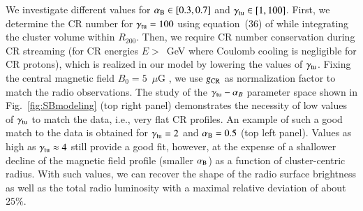 \documentclass[useAMS,usenatbib]{mn2e}
\begin{document}
We investigate different values for $\alpha_{{\mathrm{B}}}\in [0.3,0.7]$ and
$\gamma_{{\mathrm{tu}}}\in [1,100]$. First, we determine the CR number for
$\gamma_{{\mathrm{tu}}}=100$ using equation~(36) of \cite{2011A&A...527A..99E} while
integrating the cluster volume within $R_{200}$. Then, we require CR number
conservation during CR streaming (for CR energies $E>$~GeV where Coulomb cooling
is negligible for CR protons), which is realized in our model by lowering the
values of $\gamma_{{\mathrm{tu}}}$. Fixing the central magnetic field
$B_{0}=5$~$\mu$G \citep{2010A&A...513A..30B}, we use $g_{{\mathrm{CR}}}$ as
normalization factor to match the radio observations.  The study of the
$\gamma_{{\mathrm{tu}}}-\alpha_{B}$ parameter space shown in
Fig.~\ref{fig:SBmodeling} (top right panel) demonstrates the necessity of low
values of $\gamma_{{\mathrm{tu}}}$ to match the data, i.e., very flat CR profiles. An
example of such a good match to the data is obtained for $\gamma_{{\mathrm{tu}}}=2$
and $\alpha_{{\mathrm{B}}}=0.5$ (top left panel). Values as high as
$\gamma_{{\mathrm{tu}}} \approx 4$ still provide a good fit, however, at the expense
of a shallower decline of the magnetic field profile (smaller $ \alpha_{{\mathrm{B}}}$) as a
function of cluster-centric radius. With such values, we can recover the shape
of the radio surface brightness as well as the total radio luminosity with a
maximal relative deviation of about $25\%$.
\end{document}
